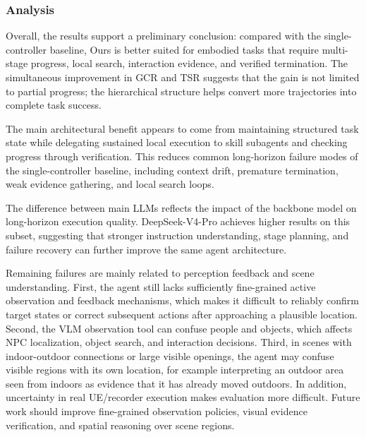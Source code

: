 \subsubsection{Analysis}
\label{subsubsec:agent-analysis}

Overall, the results support a preliminary conclusion: compared with the
single-controller baseline, Ours is better suited for embodied tasks
that require multi-stage progress, local search, interaction evidence,
and verified termination. The simultaneous improvement in GCR and TSR
suggests that the gain is not limited to partial progress; the
hierarchical structure helps convert more trajectories into complete
task success.

The main architectural benefit appears to come from maintaining
structured task state while delegating sustained local execution to
skill subagents and checking progress through verification. This reduces
common long-horizon failure modes of the single-controller baseline,
including context drift, premature termination, weak evidence gathering,
and local search loops.

The difference between main LLMs reflects the impact of the backbone
model on long-horizon execution quality. DeepSeek-V4-Pro achieves higher
results on this subset, suggesting that stronger instruction
understanding, stage planning, and failure recovery can further improve
the same agent architecture.

Remaining failures are mainly related to perception feedback and scene
understanding. First, the agent still lacks sufficiently fine-grained
active observation and feedback mechanisms, which makes it difficult to
reliably confirm target states or correct subsequent actions after
approaching a plausible location. Second, the VLM observation tool can confuse
people and objects, which affects NPC localization, object search, and
interaction decisions. Third, in scenes with indoor-outdoor connections
or large visible openings, the agent may confuse visible regions with
its own location, for example interpreting an outdoor area seen from
indoors as evidence that it has already moved outdoors. In addition,
uncertainty in real UE/recorder execution makes evaluation more
difficult. Future work should improve fine-grained observation policies,
visual evidence verification, and spatial reasoning over scene regions.


\providecommand{\NA}{--}
\providecommand{\memgroup}[2]{%
\midrule
\multicolumn{#1}{c}{\textit{#2}}\\
\midrule
}

